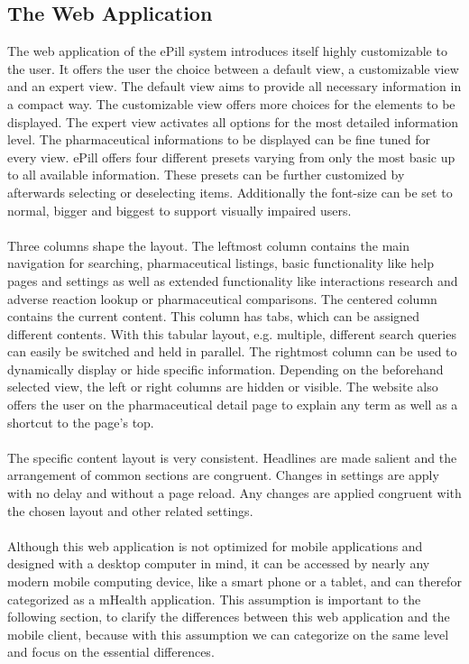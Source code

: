 \subsection{The Web Application}
The web application of the ePill system introduces itself highly customizable to the user. It offers the user the choice between a default view, a customizable view and an expert view. The default view aims to provide all necessary information in a compact way. The customizable view offers more choices for the elements to be displayed. The expert view activates all options for the most detailed information level. The pharmaceutical informations to be displayed can be fine tuned for every view. ePill offers four different presets varying from only the most basic up to all available information. These presets can be further customized by afterwards selecting or deselecting items. Additionally the font-size can be set to normal, bigger and biggest to support visually impaired users.
\\
\\
Three columns shape the layout. The leftmost column contains the main navigation for searching, pharmaceutical listings, basic functionality like help pages and settings as well as extended functionality like interactions research and adverse reaction lookup or pharmaceutical comparisons. The centered column contains the current content. This column has tabs, which can be assigned different contents. With this tabular layout, e.g. multiple, different search queries can easily be switched and held in parallel. The rightmost column can be used to dynamically display or hide specific information. Depending on the beforehand selected view, the left or right columns are hidden or visible. The website also offers the user on the pharmaceutical detail page to explain any term as well as a shortcut to the page's top.
\\
\\
The specific content layout is very consistent. Headlines are made salient and the arrangement of common sections are congruent. Changes in settings are apply with no delay and without a page reload. Any changes are applied congruent with the chosen layout and other related settings.
\\
\\
Although this web application is not optimized for mobile applications and designed with a desktop computer in mind, it can be accessed by nearly any modern mobile computing device, like a smart phone or a tablet, and can therefor categorized as a mHealth application. This assumption is important to the following section, to clarify the differences between this web application and the mobile client, because with this assumption we can categorize on the same level and focus on the essential differences.